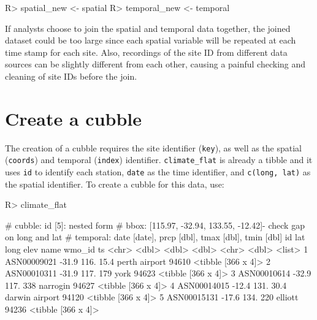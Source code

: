 \documentclass[
]{jss}
\begin{document}
\begin{CodeChunk}
\begin{CodeInput}
R> spatial_new <- spatial %
R> temporal_new <- temporal %
\end{CodeInput}
\end{CodeChunk}

If analysts choose to join the spatial and temporal data together, the
joined dataset could be too large since each spatial variable will be
repeated at each time stamp for each site. Also, recordings of the site
ID from different data sources can be slightly different from each
other, causing a painful checking and cleaning of site IDs before the
join.

\newpage

\hypertarget{create-a-cubble}{%
\section{Create a cubble}\label{create-a-cubble}}

The creation of a cubble requires the site identifier (\texttt{key}), as
well as the spatial (\texttt{coords}) and temporal (\texttt{index})
identifier. \texttt{climate\_flat} is already a tibble and it uses
\texttt{id} to identify each station, \texttt{date} as the time
identifier, and \texttt{c(long,\ lat)} as the spatial identifier. To
create a cubble for this data, use:

\begin{CodeChunk}
\begin{CodeInput}
R> climate_flat %
\end{CodeInput}
\begin{CodeOutput}
# cubble:   id [5]: nested form
# bbox:     [115.97, -32.94, 133.55, -12.42]- check gap on long and lat
# temporal: date [date], prcp [dbl], tmax [dbl], tmin [dbl]
  id            lat  long  elev name           wmo_id ts                
  <chr>       <dbl> <dbl> <dbl> <chr>           <dbl> <list>            
1 ASN00009021 -31.9  116.  15.4 perth airport   94610 <tibble [366 x 4]>
2 ASN00010311 -31.9  117. 179   york            94623 <tibble [366 x 4]>
3 ASN00010614 -32.9  117. 338   narrogin        94627 <tibble [366 x 4]>
4 ASN00014015 -12.4  131.  30.4 darwin airport  94120 <tibble [366 x 4]>
5 ASN00015131 -17.6  134. 220   elliott         94236 <tibble [366 x 4]>
\end{CodeOutput}
\end{CodeChunk}
\end{document}
